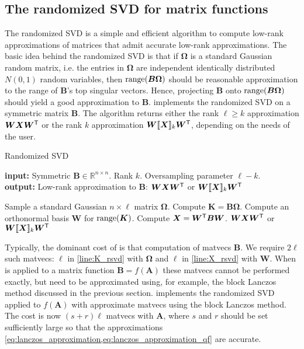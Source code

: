 \subsection{The randomized SVD for matrix functions}
The randomized SVD \cite{rsvd} is a simple and efficient algorithm to compute low-rank approximations of matrices that admit accurate low-rank approximations. The basic idea behind the randomized SVD is that if $\bm{\Omega}$ is a standard Gaussian random matrix, i.e. the entries in $\bm{\Omega}$ are independent identically distributed $N(0,1)$ random variables, then $\operatorname{range}(\bm{B} \bm{\Omega})$ should be reasonable approximation to the range of $\bm{B}$'s top singular vectors. Hence, projecting $\bm{B}$ onto $\operatorname{range}(\bm{B}\bm{\Omega})$ should yield a good approximation to $\bm{B}$.  implements the randomized SVD on a symmetric matrix $\bm{B}$. %
The algorithm returns either the rank $\ell \geq k$ approximation $\bm{W}\bm{X} \bm{W}^{\textsf{\textup{T}}}$ or the rank $k$ approximation $\bm{W}\llbracket\bm{X}\rrbracket_k \bm{W}^{\textsf{\textup{T}}}$, depending on the needs of the user.

\begin{algorithm}
\caption{Randomized SVD}
\label{alg:rsvd}
\textbf{input:} Symmetric $\bm{B} \in \mathbb{R}^{n \times n}$. Rank $k$. Oversampling parameter $\ell -k$. \\
\textbf{output:} Low-rank approximation to $\bm{B}$: $\bm{W} \bm{X} \bm{W}^{\textsf{\textup{T}}}$ or $\bm{W} \llbracket \bm{X} \rrbracket_k \bm{W}^{\textsf{\textup{T}}}$
\begin{algorithmic}[1]
    \State Sample a standard Gaussian $n \times \ell $ matrix $\bm{\Omega}$.
    \State Compute $\bm{K} = \bm{B} \bm{\Omega}$.\label{line:K_rsvd}
    \State Compute an orthonormal basis $\bm{W}$ for $\operatorname{range}(\bm{K})$.\label{line:V}
    \State Compute $\bm{X} = \bm{W}^{\textsf{\textup{T}}} \bm{B} \bm{W}$. \label{line:X_rsvd}
    \State \Return $\bm{W} \bm{X} \bm{W}^{\textsf{\textup{T}}}$ or $\bm{W} \llbracket \bm{X} \rrbracket_k \bm{W}^{\textsf{\textup{T}}}$
\end{algorithmic}
\end{algorithm}

Typically, the dominant cost of  is that computation of matvecs $\bm{B}$. We require $2\ell$ such matvecs: $\ell$ in \cref{line:K_rsvd} with $\bm{\Omega}$ and $\ell$ in \cref{line:X_rsvd} with $\bm{W}$. When  is applied to a matrix function $\bm{B} = f(\bm{A})$ these matvecs cannot be performed exactly, but need to be approximated using, for example, the block Lanczos method discussed in the previous section.
 implements the randomized SVD applied to $f(\bm{A})$ with approximate matvecs using the block Lanczos method. 
The cost is now $(s+r)\ell$ matvecs with $\bm{A}$, where $s$ and $r$ should be set sufficiently large so that the approximations \cref{eq:lanczos_approximation,eq:lanczos_approximation_qf} are accurate.

